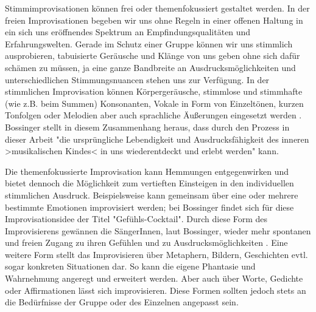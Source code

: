 Stimmimprovisationen können frei oder themenfokussiert gestaltet werden. In der freien Improvisationen begeben wir uns ohne Regeln in einer offenen Haltung in ein sich uns eröffnendes Spektrum an Empfindungsqualitäten und Erfahrungswelten. Gerade im Schutz einer Gruppe können wir uns stimmlich ausprobieren, tabuisierte Geräusche und Klänge von uns geben ohne sich dafür schämen zu müssen, ja eine ganze Bandbreite an Ausdrucksmöglichkeiten und unterschiedlichen Stimmungsnuancen stehen uns zur Verfügung. In der stimmlichen Improvisation können Körpergeräusche, stimmlose und stimmhafte (wie z.B. beim Summen) Konsonanten, Vokale in Form von Einzeltönen, kurzen Tonfolgen oder Melodien aber auch sprachliche Äußerungen eingesetzt werden \autocite[vgl.][109]{rittner1990}. Bossinger stellt in diesem Zusammenhang heraus, dass durch den Prozess in dieser Arbeit "die ursprüngliche Lebendigkeit und Ausdrucksfähigkeit des inneren >musikalischen Kindes< in uns wiederentdeckt und erlebt werden" \autocite[272]{bossinger2006}kann.

Die themenfokussierte Improvisation kann Hemmungen entgegenwirken und bietet dennoch die Möglichkeit zum vertieften Einsteigen in den individuellen stimmlichen Ausdruck. Beispielsweise kann gemeinsam über eine oder mehrere bestimmte Emotionen improvisiert werden; bei Bossinger findet sich für diese Improvisationsidee der Titel "Gefühls-Cocktail". Durch diese Form des Improvisierens gewännen die SängerInnen, laut Bossinger, wieder mehr spontanen und freien Zugang zu ihren Gefühlen und zu Ausdrucksmöglichkeiten \autocite[vgl.][273]{bossinger2006}. Eine weitere Form stellt das Improvisieren über Metaphern, Bildern, Geschichten evtl. sogar konkreten Situationen dar. So kann die eigene Phantasie und Wahrnehmung angeregt und erweitert werden. Aber auch über Worte, Gedichte oder Affirmationen lässt sich improvisieren. Diese Formen sollten jedoch stets an die Bedürfnisse der Gruppe oder des Einzelnen angepasst sein.

